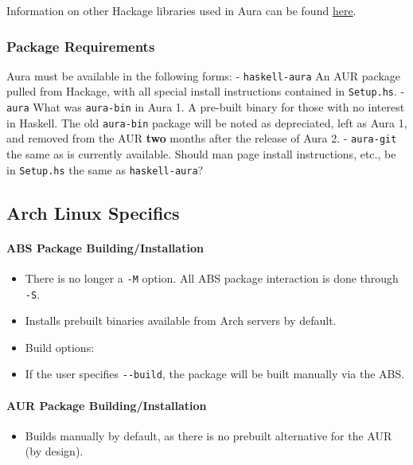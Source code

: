 \documentclass{article}
\begin{document}
Information on other Hackage libraries used in Aura can be found
\href{https://github.com/fosskers/aura/issues/223}{here}.

\subsubsection{Package Requirements}\label{package-requirements}

Aura must be available in the following forms: - \texttt{haskell-aura}
An AUR package pulled from Hackage, with all special install
instructions contained in \texttt{Setup.hs}. - \texttt{aura} What was
\texttt{aura-bin} in Aura 1. A pre-built binary for those with no
interest in Haskell. The old \texttt{aura-bin} package will be noted as
depreciated, left as Aura 1, and removed from the AUR \textbf{two}
months after the release of Aura 2. - \texttt{aura-git} the same as is
currently available. Should man page install instructions, etc., be in
\texttt{Setup.hs} the same as \texttt{haskell-aura}?

\subsection{Arch Linux Specifics}\label{arch-linux-specifics}

\paragraph{ABS Package
Building/Installation}\label{abs-package-buildinginstallation}

\begin{itemize}
\itemsep1pt\parskip0pt
\item
  There is no longer a \texttt{-M} option. All ABS package interaction
  is done through \texttt{-S}.
\item
  Installs prebuilt binaries available from Arch servers by default.
\item
  Build options:
\item
  If the user specifies \texttt{-\/-build}, the package will be built
  manually via the ABS.
\end{itemize}

\paragraph{AUR Package
Building/Installation}\label{aur-package-buildinginstallation}

\begin{itemize}
\itemsep1pt\parskip0pt
\item
  Builds manually by default, as there is no prebuilt alternative for
  the AUR (by design).
\end{itemize}
\end{document}
